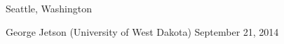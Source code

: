 

\vspace{1ex}

\begin{changemargin}{-0.3in}{0in}
\begin{etaremune}
%

\item
\headedsection %
{}
{Seattle, Washington} {

\headedsubsection %
{George Jetson \textnormal{(University of West Dakota)}}
{September 21, 2014}
{}
}

\end{etaremune}
\end{changemargin}


\spacedhrule{0.5em}{-0.4em} %
